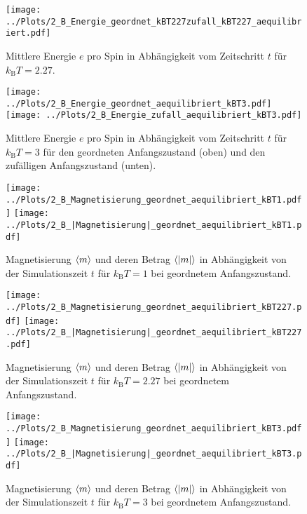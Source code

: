 \begin{figure}[H]
\centering
\texttt{[image: ../Plots/2\_B\_Energie\_geordnet\_kBT227zufall\_kBT227\_aequilibriert.pdf]}
\caption{Mittlere Energie $e$ pro Spin in Abhängigkeit vom Zeitschritt $t$ für $k_\text{B}T=\num{2,27}$.}
\label{fig:energie_kBT2.27_aequi}
\end{figure}

\begin{figure}[H]
\centering
\texttt{[image: ../Plots/2\_B\_Energie\_geordnet\_aequilibriert\_kBT3.pdf]}
\texttt{[image: ../Plots/2\_B\_Energie\_zufall\_aequilibriert\_kBT3.pdf]}
\caption{Mittlere Energie $e$ pro Spin in Abhängigkeit vom Zeitschritt $t$ für $k_\text{B}T=3$ für den geordneten Anfangszustand (oben) und den zufälligen Anfangszustand (unten).}
\label{fig:energie_kBT3_aequi}
\end{figure}

\newpage

\begin{figure}[H]
\centering
\texttt{[image: ../Plots/2\_B\_Magnetisierung\_geordnet\_aequilibriert\_kBT1.pdf]}
\texttt{[image: ../Plots/2\_B\_|Magnetisierung|\_geordnet\_aequilibriert\_kBT1.pdf]}
\caption{Magnetisierung $\braket{m}$ und deren Betrag $\braket{|m|}$ in Abhängigkeit von der Simulationszeit $t$ für $k_\text{B}T=1$ bei geordnetem Anfangszustand.}
\label{fig:magnetisierung_geordnet_kBT1}
\end{figure}

\begin{figure}[H]
\texttt{[image: ../Plots/2\_B\_Magnetisierung\_geordnet\_aequilibriert\_kBT227.pdf]}
\texttt{[image: ../Plots/2\_B\_|Magnetisierung|\_geordnet\_aequilibriert\_kBT227.pdf]}
\caption{Magnetisierung $\braket{m}$ und deren Betrag $\braket{|m|}$ in Abhängigkeit von der Simulationszeit $t$ für $k_\text{B}T=\num{2,27}$ bei geordnetem Anfangszustand.}
\label{fig:magnetisierung_geordnet_kBT227}
\end{figure}

\begin{figure}[H]
\texttt{[image: ../Plots/2\_B\_Magnetisierung\_geordnet\_aequilibriert\_kBT3.pdf]}
\texttt{[image: ../Plots/2\_B\_|Magnetisierung|\_geordnet\_aequilibriert\_kBT3.pdf]}
\caption{Magnetisierung $\braket{m}$ und deren Betrag $\braket{|m|}$ in Abhängigkeit von der Simulationszeit $t$ für $k_\text{B}T=3$ bei geordnetem Anfangszustand.}
\label{fig:magnetisierung_geordnet_kBT3}
\end{figure}

